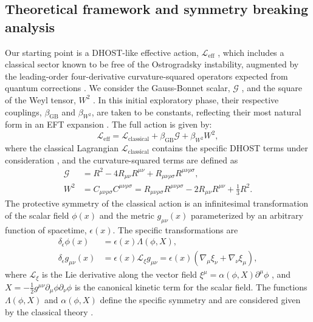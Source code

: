 \documentclass[twocolumn]{aastex631}
\begin{document}
\subsection{Theoretical framework and symmetry breaking analysis}
Our starting point is a DHOST-like effective action, $\mathcal{L}_{\text{eff}}$ \citep{achour2020rotatingblackholesdhost}, which includes a classical sector known to be free of the Ostrogradsky instability, augmented by the leading-order four-derivative curvature-squared operators expected from quantum corrections \citep{eichhorn2025purelymetrichorndeskitheories,eichhorn2025purelymetrichorndeskitheories}. We consider the Gauss-Bonnet scalar, $\mathcal{G}$ \citep{eichhorn2025purelymetrichorndeskitheories}, and the square of the Weyl tensor, $W^2$ \citep{cheung2017positivitycurvaturesquaredcorrectionsgravity}. In this initial exploratory phase, their respective couplings, $\beta_{\text{GB}}$ and $\beta_{W^2}$, are taken to be constants, reflecting their most natural form in an EFT expansion \citep{cheung2017positivitycurvaturesquaredcorrectionsgravity,calmet2017gravitationaleffectiveactionsecond}. The full action is given by:
\begin{equation}
\mathcal{L}_{\text{eff}} = \mathcal{L}_{\text{classical}} + \beta_{\text{GB}} \mathcal{G} + \beta_{W^2} W^2,
\end{equation}
where the classical Lagrangian $\mathcal{L}_{\text{classical}}$ contains the specific DHOST terms under consideration \citep{ilyas2020dhostbounce,colléaux2024classificationgeneralisedhigherordereinsteinmaxwell}, and the curvature-squared terms are defined as
\begin{align}
\mathcal{G} &= R^2 - 4 R_{\mu\nu}R^{\mu\nu} + R_{\mu\nu\rho\sigma}R^{\mu\nu\rho\sigma}, \\
W^2 &= C_{\mu\nu\rho\sigma}C^{\mu\nu\rho\sigma} = R_{\mu\nu\rho\sigma}R^{\mu\nu\rho\sigma} - 2 R_{\mu\nu}R^{\mu\nu} + \frac{1}{3}R^2.
\end{align}
The protective symmetry of the classical action is an infinitesimal transformation of the scalar field $\phi(x)$ and the metric $g_{\mu\nu}(x)$ parameterized by an arbitrary function of spacetime, $\epsilon(x)$. The specific transformations are
\begin{align}
\delta_\epsilon \phi(x) &= \epsilon(x) \Lambda(\phi, X), \label{eq:phi_transf} \\
\delta_\epsilon g_{\mu\nu}(x) &= \epsilon(x) \mathcal{L}_{\xi} g_{\mu\nu} = \epsilon(x) \left( \nabla_\mu \xi_\nu + \nabla_\nu \xi_\mu \right), \label{eq:g_transf}
\end{align}
where $\mathcal{L}_{\xi}$ is the Lie derivative along the vector field $\xi^\mu = \alpha(\phi, X) \partial^\mu\phi$ \citep{fabbri2025polarformdiracfields}, and $X = -\frac{1}{2}g^{\mu\nu}\partial_\mu\phi\partial_\nu\phi$ is the canonical kinetic term for the scalar field. The functions $\Lambda(\phi, X)$ and $\alpha(\phi, X)$ define the specific symmetry and are considered given by the classical theory \citep{fabbri2025polarformdiracfields}.
\end{document}
